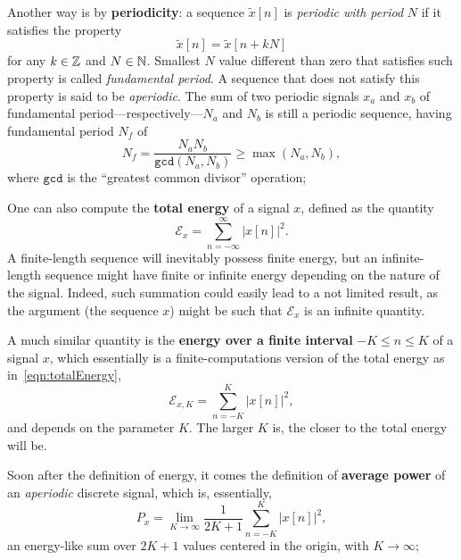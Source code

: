 \documentclass[\documentfontsize, twocolumn]{\classname}
\begin{document}
Another way is by \textbf{periodicity}: a se\-quen\-ce $\tilde{x}[n]$ is \emph{periodic with period} $N$ if it satisfies the property \[\tilde{x}[n] = \tilde{x}[n + kN]\] for any $k \in \mathbb Z$ and $N \in \mathbb N$. Smallest $N$ value different than zero that satisfies such property is called \emph{fundamental period}. A se\-quen\-ce that does not satisfy this property is said to be \emph{aperiodic}. The sum of two periodic signals $x_a$ and $x_b$ of fundamental period---re\-spec\-ti\-ve\-ly---$N_a$ and $N_b$ is still a periodic se\-quen\-ce, having fundamental period $N_f$ of \[N_f = \frac{N_a N_b}{\mathrm{\texttt{gcd}}(N_a, N_b)} \geq \max{(N_a, N_b)},\] where $\mathrm{\texttt{gcd}}$ is the ``greatest common divisor'' operation;

One can also compute the \textbf{total energy} of a signal $x$, defined as the quantity
\begin{equation}\label{eqn:totalEnergy}
    \mathcal E_x = \sum_{n=-\infty}^{\infty} | x[n] |^2.
\end{equation}
A finite-length se\-quen\-ce will inevitably possess finite energy, but an infinite-length se\-quen\-ce might have finite or infinite energy depending on the nature of the signal. Indeed, such summation could easily lead to a not limited result, as the argument (the sequence $x$) might be such that $\mathcal E_x$ is an infinite quantity.

A much similar quantity is the \textbf{energy over a finite interval} $-K \leq n \leq K$ of a signal $x$, which essentially is a finite-computations version of the total energy as in~\ref{eqn:totalEnergy},
\begin{equation}\label{eqn:totalEnergyOverInterval}
    \mathcal E_{x,K} = \sum_{n=-K}^{K} | x[n] |^2,
\end{equation}
and depends on the parameter $K$. The larger $K$ is, the closer to the total energy will be.

Soon after the definition of energy, it comes the definition of \textbf{average power} of an \emph{aperiodic} discrete signal, which is, essentially,
\begin{equation}\label{eqn:averagePower}
    P_x = \lim_{K \rightarrow \infty} \frac{1}{2K + 1} \sum_{n = -K}^K |x[n]|^2,
\end{equation}
an energy-like sum over $2K + 1$ values centered in the origin, with $K \rightarrow \infty$;
\end{document}
